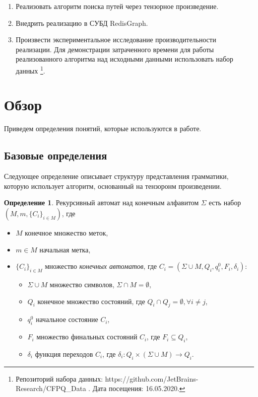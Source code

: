 \documentclass[14pt]{matmex-diploma}
\theoremstyle{definition}
\newtheorem{definition}{Определение}[section]
\begin{document}
\begin{enumerate}
    \item Реализовать алгоритм поиска путей через тензорное произведение.
    
    \item Внедрить реализацию в СУБД RedisGraph.
    
    \item Произвести экспериментальное исследование производительности реализации. Для демонстрации затраченного времени для работы реализованного алгоритма над исходными данными использовать набор данных \footnote{Репозиторий набора данных: https://github.com/JetBrains-Research/CFPQ\_Data . Дата посещения: 16.05.2020.}.
\end{enumerate}

\section{Обзор}
Приведем определения понятий, которые используются в работе.
\subsection{Базовые определения}
Следующее определение описывает структуру представления грамматики, которую использует алгоритм, основанный на тензоронм произведении.
\theoremstyle{definition}
\begin{definition}
Рекурсивный автомат \cite{rec} над конечным алфавитом $\Sigma$ есть набор $(M,m,\{C_i\}_{i \in M})$, где 

\begin{itemize}
    \item $M$ конечное множество меток,
    \item $m \in M$ начальная метка,
    \item $ \{C_i\}_{i \in M} $ множество \textit{конечных автоматов},
          где $C_i=(\Sigma \cup M, Q_i,q_i^0,F_i,\delta_i)$:
    \begin{itemize}
        \item $\Sigma \cup M$ множество символов, $\Sigma \cap M = \emptyset$,
        \item $Q_i$ конечное множество состояний,
              где $Q_i \cap Q_j = \emptyset, \forall i \neq j$,
        \item $q_i^0$ начальное состояние $C_i$,
        \item $F_i$ множество финальных состояний $C_i$, где $F_i \subseteq Q_i$,
        \item $\delta_i$ функция переходов $C_i$,
              где $\delta_i: Q_i \times (\Sigma \cup M)
              \to Q_i$.
    \end{itemize}
\end{itemize}
\end{definition}
\end{document}
